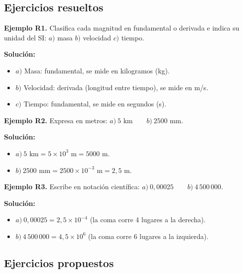 \documentclass[12pt, letterpaper]{article}
\begin{document}
\subsection{Ejercicios resueltos}

\textbf{Ejemplo R1.} Clasifica cada magnitud en fundamental o derivada e indica su unidad del SI: $a)$ masa \quad $b)$ velocidad \quad $c)$ tiempo.

\begin{cuadrosolucion}
  \textbf{Solución:}
  \begin{itemize}
    \item $a)$ Masa: fundamental, se mide en kilogramos (kg).
    \item $b)$ Velocidad: derivada (longitud entre tiempo), se mide en m/s.
    \item $c)$ Tiempo: fundamental, se mide en segundos (s).
  \end{itemize}
\end{cuadrosolucion}

\textbf{Ejemplo R2.} Expresa en metros: $a)\ 5 \text{ km} \qquad b)\ 2500 \text{ mm}$.

\begin{cuadrosolucion}
  \textbf{Solución:}
  \begin{itemize}
    \item $a)\ 5 \text{ km} = 5 \times 10^{3} \text{ m} = 5000 \text{ m}$.
    \item $b)\ 2500 \text{ mm} = 2500 \times 10^{-3} \text{ m} = 2{,}5 \text{ m}$.
  \end{itemize}
\end{cuadrosolucion}

\textbf{Ejemplo R3.} Escribe en notación científica: $a)\ 0{,}00025 \qquad b)\ 4\,500\,000$.

\begin{cuadrosolucion}
  \textbf{Solución:}
  \begin{itemize}
    \item $a)\ 0{,}00025 = 2{,}5 \times 10^{-4}$ (la coma corre 4 lugares a la derecha).
    \item $b)\ 4\,500\,000 = 4{,}5 \times 10^{6}$ (la coma corre 6 lugares a la izquierda).
  \end{itemize}
\end{cuadrosolucion}

\subsection{Ejercicios propuestos}
\end{document}
